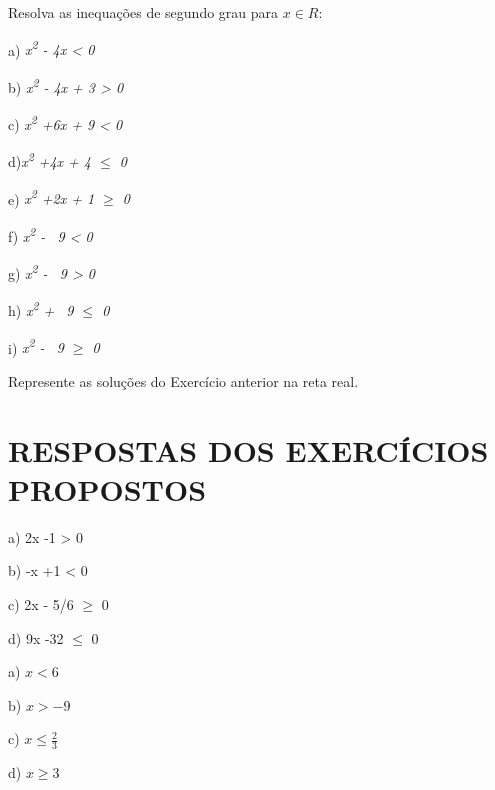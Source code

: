 \begin{exercicios}
	\exitem{} Resolva as inequações de segundo grau para $x \in R $:

	a) \textit{x\textsuperscript{2} - 4x < 0}

	b) \textit{x\textsuperscript{2} - 4x + 3 > 0}

	c) \textit{x\textsuperscript{2} +6x + 9 < 0}

    d)\textit{x\textsuperscript{2} +4x + 4 $ \leq $  0}

    e) \textit{ x\textsuperscript{2} +2x + 1 $ \geq $  0}

    f)\textit{  x\textsuperscript{2} -~ 9 < 0}

    g) \textit{x\textsuperscript{2} -~ 9 > 0}

    h) \textit{x\textsuperscript{2} +~ 9 $ \leq $ 0}

    i) \textit{x\textsuperscript{2} -~ 9 $ \geq $  0}
	\item Represente as soluções do Exercício anterior na reta real.
\end{exercicios}

\section{RESPOSTAS DOS EXERCÍCIOS PROPOSTOS}

\begin{respostas}{2}





    \ansitem{}
    a) 2x -1 > 0
    
    b) -x +1 < 0
    
    c) 2x - 5/6 $ \geq $  0
    
    d) 9x -32 $ \leq $ 0

    \ansitem{}
    a) $x < 6$
    
    b) $x > -9$
    
    c) $x \leq \frac{2}{3}$
    
    d) $x \geq 3$
\end{respostas}

